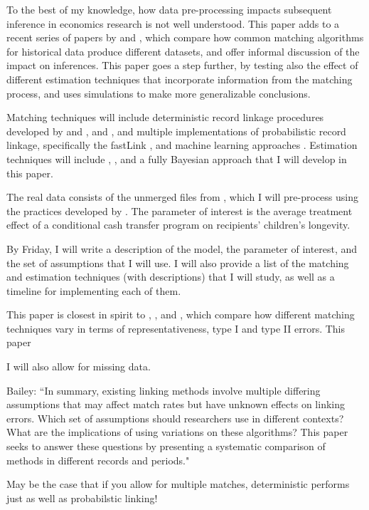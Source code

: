\documentclass[12pt]{article}
\begin{document}
To the best of my knowledge, how data pre-processing impacts subsequent inference in economics research is not well understood.  This paper adds to a recent series of papers by  \cite{bailey2017} and \cite{arp2018, abe2019}, which compare how common matching algorithms for historical data produce different datasets, and offer informal discussion of the impact on inferences.  This paper goes a step further, by testing also the effect of different estimation techniques that incorporate information from the matching process, and uses simulations to make more generalizable conclusions.  

Matching techniques will include deterministic record linkage procedures developed by \cite{ferrie96} and \cite{abe2012, abe2014, abe2017}, and \cite{aizer2016}, and multiple implementations of probabilistic record linkage, specifically the fastLink \cite{enamorado2019}, and machine learning approaches \cite{Feigenbaum2016AML}. Estimation techniques will include \cite{ahl2019}, \cite{lahiri05}, and a fully Bayesian approach that I will develop in this paper. 

The real data consists of the unmerged files from \cite{aizer2016}, which I will pre-process using the practices developed by \cite{arp2018}.  The parameter of interest is the average treatment effect of a conditional cash transfer program on recipients' children's longevity.   

By Friday, I will write a description of the model, the parameter of interest, and the set of assumptions that I will use.   I will also provide a list of the matching and estimation techniques (with descriptions) that I will study, as well as a timeline for implementing each of them. 

This paper is closest in spirit to \cite{bailey2017}, \cite{arp2018}, and \cite{abe2019}, which compare how different matching techniques vary in terms of representativeness, type I and type II errors.  This paper 

 
I will also allow for missing data. 

Bailey: ``In summary, existing linking methods involve multiple differing assumptions that may affect match
rates but have unknown effects on linking errors. Which set of assumptions should researchers use in
different contexts? What are the implications of using variations on these algorithms? This paper seeks to
answer these questions by presenting a systematic comparison of methods in different records and periods."

May be the case that if you allow for multiple matches, deterministic performs just as well as probabilstic linking! 
\end{document}
